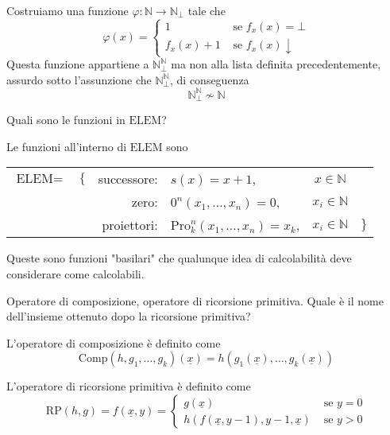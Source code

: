 \documentclass[12pt, answers]{exam}
\theoremstyle{plain}
\newcommand{\elem}{\text{ELEM}}
\newcommand{\comp}{\text{Comp}}
\newcommand{\rp}{\text{RP}}
\newcommand{\N}{\mathbb{N}}
\newcommand{\pro}{\text{Pro}}
\begin{document}
\begin{questions}
\begin{solution}
            Costruiamo una funzione $\varphi: \N \rightarrow \N_\bot$ tale che
            $$ \varphi (x) = \begin{cases}
                1 & \text{ se } f_x(x) = \bot \\
                f_x(x) + 1 & \text{ se } f_x(x) \downarrow
            \end{cases}$$
            Questa funzione appartiene a $\N_\bot^\N$ ma non alla lista definita precedentemente, assurdo sotto l'assunzione che $\N_\bot^\N$, di conseguenza
            $$ \N_\bot^\N \nsim \N $$
        \end{solution}
        
        \question Quali sono le funzioni in $\elem$?
        
        \begin{solution}
            Le funzioni all'interno di $\elem$ sono
            \begin{center}
                \begin{tabular}{r c r l c l}
                    $\elem = $ & $\{$ & successore: & $s(x) = x + 1$, & $x \in \N$ & \\
                    && zero: & $0^n (x_1, \dots, x_n) = 0$, & $x_i \in \N$ & \\
                    && proiettori: & $\pro_k^n (x_1, \dots, x_n) = x_k$, & $x_i \in \N$& $\}$ \\
                \end{tabular}
            \end{center}
            
            Queste sono funzioni "basilari" che qualunque idea di calcolabilità deve considerare come calcolabili.
        \end{solution}
        
        \question Operatore di composizione, operatore di ricorsione primitiva. Quale è il nome dell'insieme ottenuto dopo la ricorsione primitiva?
        
        \begin{solution}
            L'operatore di composizione è definito come
            $$ \comp (h, g_1, \dots, g_k) (\underline{x}) = h(g_1 (\underline{x}), \dots, g_k (\underline{x})) $$
            
            L'operatore di ricorsione primitiva è definito come
            $$
            \rp(h,g) = f(\underline{x}, y) = \begin{cases}
                g(\underline{x}) & \text{ se } y = 0 \\
                h(f(\underline{x}, y-1), y-1, \underline{x}) & \text{ se } y > 0 
            \end{cases}
            $$
            

\end{solution}
\end{questions}
\end{document}
